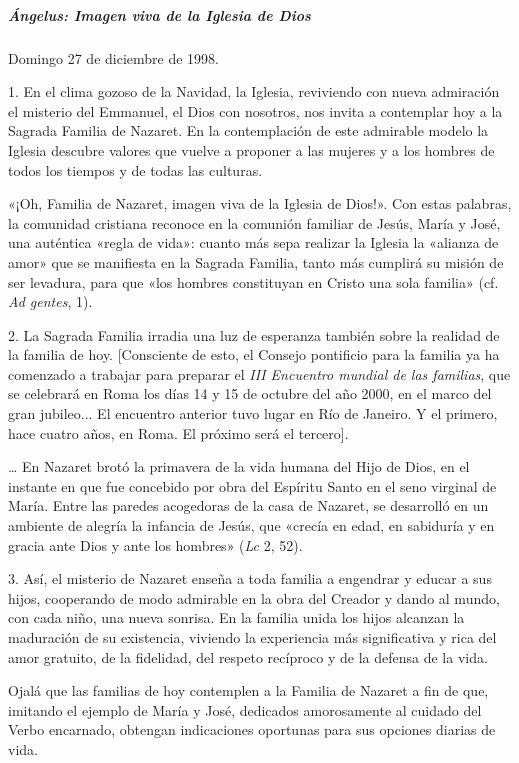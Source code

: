 \documentclass[]{article}
\let\oldsubparagraph\subparagraph
\renewcommand{\subparagraph}[1]{\oldsubparagraph{#1}\mbox{}}
\begin{document}
\subparagraph{Ángelus: Imagen viva de la Iglesia de
Dios}\label{uxe1ngelus-imagen-viva-de-la-iglesia-de-dios}

Domingo 27 de diciembre de 1998.

1. En el clima gozoso de la Navidad, la Iglesia, reviviendo con nueva
admiración el misterio del Emmanuel, el Dios con nosotros, nos invita a
contemplar hoy a la Sagrada Familia de Nazaret. En la contemplación de
este admirable modelo la Iglesia descubre valores que vuelve a proponer
a las mujeres y a los hombres de todos los tiempos y de todas las
culturas.

«¡Oh, Familia de Nazaret, imagen viva de la Iglesia de Dios!». Con estas
palabras, la comunidad cristiana reconoce en la comunión familiar de
Jesús, María y José, una auténtica «regla de vida»: cuanto más sepa
realizar la Iglesia la «alianza de amor» que se manifiesta en la Sagrada
Familia, tanto más cumplirá su misión de ser levadura, para que «los
hombres constituyan en Cristo una sola familia» (cf. \emph{Ad gentes},
1).

2. La Sagrada Familia irradia una luz de esperanza también sobre la
realidad de la familia de hoy. {[}Consciente de esto, el Consejo
pontificio para la familia ya ha comenzado a trabajar para preparar el
\emph{III Encuentro mundial de las familias}, que se celebrará en Roma
los días 14 y 15 de octubre del año 2000, en el marco del gran
jubileo... El encuentro anterior tuvo lugar en Río de Janeiro. Y el
primero, hace cuatro años, en Roma. El próximo será el tercero{]}.

\ldots{} En Nazaret brotó la primavera de la vida humana del Hijo de
Dios, en el instante en que fue concebido por obra del Espíritu Santo en
el seno virginal de María. Entre las paredes acogedoras de la casa de
Nazaret, se desarrolló en un ambiente de alegría la infancia de Jesús,
que «crecía en edad, en sabiduría y en gracia ante Dios y ante los
hombres» (\emph{Lc} 2, 52).

3. Así, el misterio de Nazaret enseña a toda familia a engendrar y
educar a sus hijos, cooperando de modo admirable en la obra del Creador
y dando al mundo, con cada niño, una nueva sonrisa. En la familia unida
los hijos alcanzan la maduración de su existencia, viviendo la
experiencia más significativa y rica del amor gratuito, de la fidelidad,
del respeto recíproco y de la defensa de la vida.

Ojalá que las familias de hoy contemplen a la Familia de Nazaret a fin
de que, imitando el ejemplo de María y José, dedicados amorosamente al
cuidado del Verbo encarnado, obtengan indicaciones oportunas para sus
opciones diarias de vida.
\end{document}
